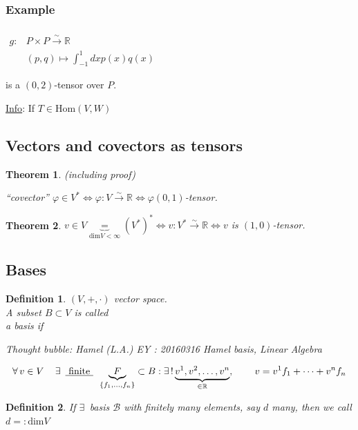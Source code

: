 \documentclass[10pt]{amsart}
\newtheorem{theorem}{Theorem}
\newtheorem{definition}{Definition}
\begin{document}
\begin{multicols*}{2}
\subsubsection*{Example} $\begin{aligned} & \quad \\
g: & P \times P \xrightarrow{ \sim } \mathbb{R} \\
& (p,q) \mapsto \int_{-1}^1 dx p(x) q(x) \end{aligned}$

is a $(0,2)$-tensor over $P$.  

\underline{Info}: If $T \in \text{Hom}(V,W)$

\subsection{Vectors and covectors as tensors}

\begin{theorem} (including proof)
	
	``covector''  $\varphi \in V^* \Longleftrightarrow \varphi : V \xrightarrow{ \sim } \mathbb{R} \Longleftrightarrow \varphi (0,1)$-tensor.  
\end{theorem}

\begin{theorem}
	$v\in V \underbrace{=}_{\text{dim}V<\infty} (V^*)^* \Longleftrightarrow v: V^* \xrightarrow{ \sim} \mathbb{R} \Longleftrightarrow v $ is $(1,0)$-tensor.  
\end{theorem}

\subsection{Bases}

\begin{definition}
	$(V,+,\cdot)$ vector space. \\
	A subset $B\subset V$ is called \\
	a basis if 
	
	Thought bubble: Hamel (L.A.) EY : 20160316 Hamel basis, Linear Algebra
	
	\[
	\forall \, v \in V \quad \, \exists \, \text{ \underline{ finite } } \, \underbrace{F}_{ \lbrace f_1 , \dots , f_n \rbrace }  \subset B : \exists \, ! \underbrace{ v^1, v^2 , \dots , v^n }_{ \in \mathbb{R} },  \qquad \, v = v^1 f_1 + \dots + v^n f_n 
	\]
\end{definition}

\begin{definition}
	If $\exists \, $ basis $\mathcal{B}$ with finitely many elements, say $d$ many, then we call $d =:\text{dim}{V}$
	

\end{definition}
\end{multicols*}
\end{document}
